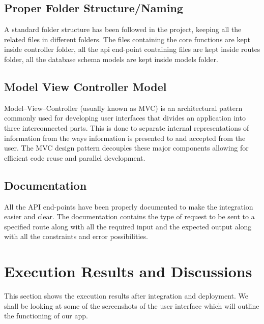 \subsection{Proper Folder Structure/Naming}
A standard folder structure has been followed in the project, keeping all the related files in different folders. The files containing the core functions are kept inside controller folder, all the api end-point containing files are kept inside routes folder, all the database schema models are kept inside models folder.

\subsection{Model View Controller Model}
Model–View–Controller (usually known as MVC) is an architectural pattern commonly used for developing user interfaces that divides an application into three interconnected parts. This is done to separate internal representations of information from the ways information is presented to and accepted from the user. The MVC design pattern decouples these major components allowing for efficient code reuse and parallel development.

\subsection{Documentation}
All the API end-points have been properly documented to make the integration easier and clear. The documentation contains the type of request to be sent to a specified route along with all the required input and the expected output along with all the constraints and error possibilities.

\pagebreak

\section{Execution Results and Discussions}

This section shows the execution results after integration and deployment. We shall be looking at some of the screenshots of the user interface which will outline the functioning of our app.


\subsubsection{}

